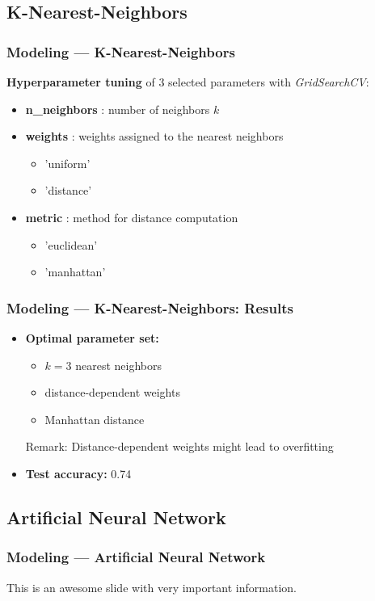 \documentclass[10pt, aspectratio=169]{beamer}
\begin{document}
\subsection{K-Nearest-Neighbors}
\begin{frame}
    \frametitle{Modeling --- K-Nearest-Neighbors}
    \textbf{Hyperparameter tuning} of 3 selected parameters with \textit{GridSearchCV}:
    \begin{itemize}
        \item \textbf{n\_neighbors} : number of neighbors $k$
        \item \textbf{weights} : weights assigned to the nearest neighbors
            \begin{itemize} 
                \item 'uniform'
                \item 'distance'
            \end{itemize}
        \item \textbf{metric} : method for distance computation
            \begin{itemize}
                \item 'euclidean'
                \item 'manhattan'
            \end{itemize}
    \end{itemize}
\end{frame}
\begin{frame}
    \frametitle{Modeling --- K-Nearest-Neighbors: Results}
    \begin{itemize}
        \item \textbf{Optimal parameter set:}
            \begin{itemize}
                \item $k=3$ nearest neighbors
                \item distance-dependent weights
                \item Manhattan distance
            \end{itemize}
            Remark: Distance-dependent weights might lead to overfitting
        \item \textbf{Test accuracy:} 0.74
    \end{itemize}
\end{frame}

\subsection{Artificial Neural Network}
\begin{frame}
    \frametitle{Modeling --- Artificial Neural Network}
    \begin{outline}
        \1 This is an awesome slide with very important information. 
    \end{outline}   
\end{frame}
\end{document}
